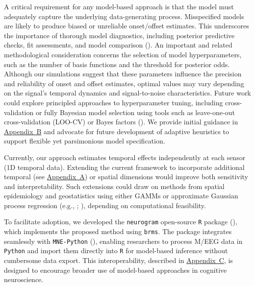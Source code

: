 \documentclass[
  doc,
  floatsintext,
  longtable,
  a4paper,
  nolmodern,
  notxfonts,
  notimes,
  colorlinks=true,linkcolor=blue,citecolor=blue,urlcolor=blue]{apa7}
\begin{document}
A critical requirement for any model-based approach is that the model
must adequately capture the underlying data-generating process.
Misspecified models are likely to produce biased or unreliable
onset/offset estimates. This underscores the importance of thorough
model diagnostics, including posterior predictive checks, fit
assessments, and model comparison (). An important and related methodological consideration
concerns the selection of model hyperparameters, such as the number of
basis functions and the threshold for posterior odds. Although our
simulations suggest that these parameters influence the precision and
reliability of onset and offset estimates, optimal values may vary
depending on the signal's temporal dynamics and signal-to-noise
characteristics. Future work could explore principled approaches to
hyperparameter tuning, including cross-validation or fully Bayesian
model selection using tools such as leave-one-out cross-validation
(LOO-CV) or Bayes factors (). We provide initial guidance in \hyperref[apx-basis]{Appendix~B}
and advocate for future development of adaptive heuristics to support
flexible yet parsimonious model specification.

Currently, our approach estimates temporal effects independently at each
sensor (1D temporal data). Extending the current framework to
incorporate additional temporal (see \hyperref[apx-2D]{Appendix~A}) or
spatial dimensions would improve both sensitivity and interpretability.
Such extensions could draw on methods from spatial epidemiology and
geostatistics using either GAMMs or approximate Gaussian process
regression (e.g., ; ), depending on computational feasibility.

To facilitate adoption, we developed the \texttt{neurogram} open-source
\texttt{R} package (), which
implements the proposed method using \texttt{brms}. The package
integrates seamlessly with \texttt{MNE-Python}
(), enabling researchers to
process M/EEG data in \texttt{Python} and import them directly into
\texttt{R} for model-based inference without cumbersome data export.
This interoperability, described in \hyperref[apx-package]{Appendix~C},
is designed to encourage broader use of model-based approaches in
cognitive neuroscience.
\end{document}
